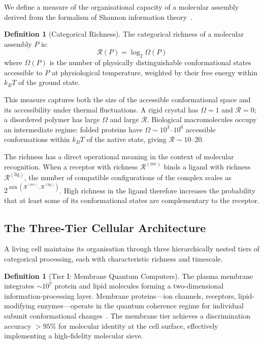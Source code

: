 \documentclass[11pt,twocolumn,a4paper]{article}
\theoremstyle{definition}
\newtheorem{definition}[theorem]{Definition}
\theoremstyle{remark}
\newcommand{\Rcat}{\mathcal{R}}
\begin{document}
We define a measure of the organisational capacity of a molecular assembly derived from the formalism of Shannon information theory~\cite{Shannon1948,Cover1991}.

\begin{definition}[Categorical Richness]
\label{def:richness}
The categorical richness of a molecular assembly $P$ is:
\begin{equation}
  \Rcat(P) = \log_2 \Omega(P)
  \label{eq:richness}
\end{equation}
where $\Omega(P)$ is the number of physically distinguishable conformational states accessible to $P$ at physiological temperature, weighted by their free energy within $k_BT$ of the ground state.
\end{definition}

This measure captures both the size of the accessible conformational space and its accessibility under thermal fluctuations. A rigid crystal has $\Omega = 1$ and $\Rcat = 0$; a disordered polymer has large $\Omega$ and large $\Rcat$. Biological macromolecules occupy an intermediate regime: folded proteins have $\Omega \sim 10^3$--$10^6$ accessible conformations within $k_BT$ of the native state, giving $\Rcat \sim 10$--20.

The richness has a direct operational meaning in the context of molecular recognition. When a receptor with richness $\Rcat^{(\mathrm{rec})}$ binds a ligand with richness $\Rcat^{(\mathrm{lig})}$, the number of compatible configurations of the complex scales as $2^{\min(\Rcat^{(\mathrm{rec})}, \Rcat^{(\mathrm{lig})})}$. High richness in the ligand therefore increases the probability that at least some of its conformational states are complementary to the receptor.

\subsection{The Three-Tier Cellular Architecture}

A living cell maintains its organisation through three hierarchically nested tiers of categorical processing, each with characteristic richness and timescale.

\begin{definition}[Tier I: Membrane Quantum Computers]
\label{def:tier1}
The plasma membrane integrates $\sim\!10^7$ protein and lipid molecules forming a two-dimensional information-processing layer. Membrane proteins---ion channels, receptors, lipid-modifying enzymes---operate in the quantum coherence regime for individual subunit conformational changes~\cite{Fleming2011}. The membrane tier achieves a discrimination accuracy $>95\%$ for molecular identity at the cell surface, effectively implementing a high-fidelity molecular sieve.
\end{definition}
\end{document}
